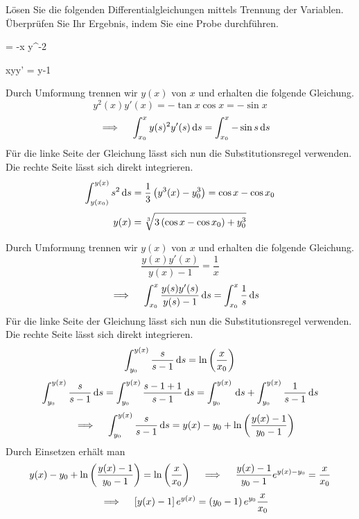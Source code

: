 \begin{atiTask}[
	title = Zwei separable Differentialgleichungen,
	language = Deutsch
]
	Lösen Sie die folgenden Differentialgleichungen mittels Trennung der Variablen.
	Überprüfen Sie Ihr Ergebnis, indem Sie eine Probe durchführen.
	\begin{atiSubequations}
		\item{
			 = -\tan x \cdot y^{-2}
		}
		\item{
			xyy' = y-1
		}
	\end{atiSubequations}
\end{atiTask}
\begin{atiSolution}
	\begin{atiSubtaskSolutions}
		\item[\localref{dgl1}]{
			Durch Umformung trennen wir $y(x)$ von $x$ und erhalten die folgende Gleichung.
			\[
				y^2(x)y'(x) = -\tan x \cos x = -\sin x
			\]
			\[
				\implies \integral{x_0}{x}{y(s)^2y'(s)}{s} = \integral{x_0}{x}{-\sin s}{s}
			\]
			Für die linke Seite der Gleichung lässt sich nun die Substitutionsregel verwenden.
			Die rechte Seite lässt sich direkt integrieren.
			\[
				\int_{y(x_0)}^{y(x)} s^2\,\mathrm{d} s = \frac{1}{3}\left( y^3(x)-y^3_0 \right) = \cos x - \cos x_0
			\]
			\[
				y(x) = \sqrt[3]{3\left( \cos x - \cos x_0 \right) + y_0^3}
			\]
		}
		\item[\localref{dgl2}]{
			Durch Umformung trennen wir $y(x)$ von $x$ und erhalten die folgende Gleichung.
			\[
				\frac{y(x)y'(x)}{y(x)-1} = \frac{1}{x}
			\]
			\[
				\implies \integral{x_0}{x}{\frac{y(s)y'(s)}{y(s)-1}}{s} = \integral{x_0}{x}{\frac{1}{s}}{s}
			\]
			Für die linke Seite der Gleichung lässt sich nun die Substitutionsregel verwenden.
			Die rechte Seite lässt sich direkt integrieren.
			\[
				\int_{y_0}^{y(x)} \frac{s}{s-1}\,\mathrm{d} s = \ln\left( \frac{x}{x_0} \right)
			\]
			\[
				\int_{y_0}^{y(x)} \frac{s}{s-1}\,\mathrm{d} s = \int_{y_0}^{y(x)} \frac{s-1+1}{s-1}\,\mathrm{d} s = \int_{y_0}^{y(x)} \,\mathrm{d} s + \int_{y_0}^{y(x)} \frac{1}{s-1}\,\mathrm{d} s
			\]
			\[
				\implies \integral{y_0}{y(x)}{\frac{s}{s-1}}{s} = y(x)-y_0 + \ln\curvb{\frac{y(x)-1}{y_0-1}}
			\]
			Durch Einsetzen erhält man
			\[
				y(x)-y_0 + \ln\curvb{\frac{y(x)-1}{y_0-1}} = \ln\curvb{\frac{x}{x_0}} \implies \frac{y(x)-1}{y_0-1}e^{y(x)-y_0} = \frac{x}{x_0}
			\]
			\[
				\implies \boxb{y(x)-1}e^{y(x)} = \curvb{y_0-1}e^{y_0}\frac{x}{x_0}
			\]
		}
	\end{atiSubtaskSolutions}
\end{atiSolution}